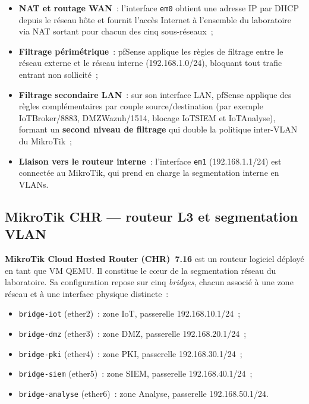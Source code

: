 \begin{itemize}[leftmargin=*]
  \item \textbf{NAT et routage WAN}~: l'interface \texttt{em0} obtient une adresse IP par DHCP depuis le réseau hôte et fournit l'accès Internet à l'ensemble du laboratoire via NAT sortant pour chacun des cinq sous-réseaux~;
  \item \textbf{Filtrage périmétrique}~: pfSense applique les règles de filtrage entre le réseau externe et le réseau interne (192.168.1.0/24), bloquant tout trafic entrant non sollicité~;
  \item \textbf{Filtrage secondaire LAN}~: sur son interface LAN, pfSense applique des règles complémentaires par couple source/destination (par exemple IoT\textrightarrow{}Broker/8883, DMZ\textrightarrow{}Wazuh/1514, blocage IoT\textrightarrow{}SIEM et IoT\textrightarrow{}Analyse), formant un \textbf{second niveau de filtrage} qui double la politique inter-VLAN du MikroTik~;
  \item \textbf{Liaison vers le routeur interne}~: l'interface \texttt{em1} (192.168.1.1/24) est connectée au MikroTik, qui prend en charge la segmentation interne en VLANs.
\end{itemize}

\subsection{MikroTik CHR --- routeur L3 et segmentation VLAN}
\label{subsec:env-mikrotik}

\textbf{MikroTik Cloud Hosted Router (CHR)~7.16} est un routeur logiciel déployé en tant que VM QEMU. Il constitue le c\oe{}ur de la segmentation réseau du laboratoire. Sa configuration repose sur cinq \emph{bridges}, chacun associé à une zone réseau et à une interface physique distincte~:

\begin{itemize}[leftmargin=*]
  \item \texttt{bridge-iot} (ether2)~: zone IoT, passerelle 192.168.10.1/24~;
  \item \texttt{bridge-dmz} (ether3)~: zone DMZ, passerelle 192.168.20.1/24~;
  \item \texttt{bridge-pki} (ether4)~: zone PKI, passerelle 192.168.30.1/24~;
  \item \texttt{bridge-siem} (ether5)~: zone SIEM, passerelle 192.168.40.1/24~;
  \item \texttt{bridge-analyse} (ether6)~: zone Analyse, passerelle 192.168.50.1/24.
\end{itemize}

